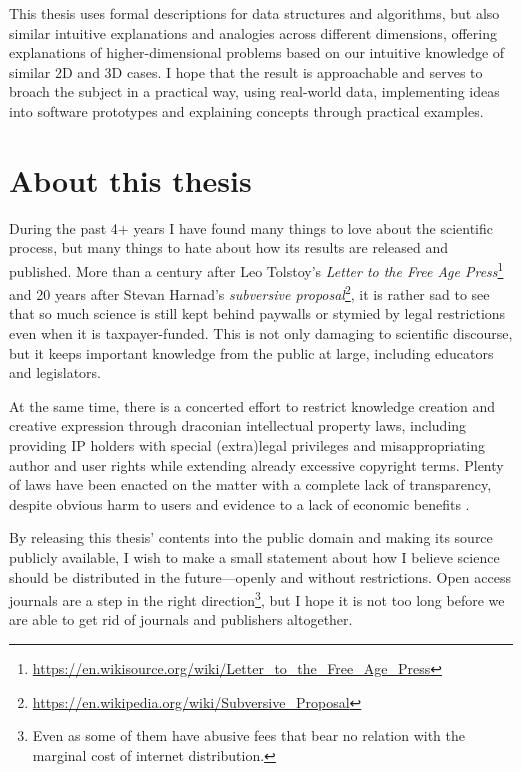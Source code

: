 This thesis uses formal descriptions for data structures and algorithms, but also similar intuitive explanations and analogies across different dimensions, offering explanations of higher-dimensional problems based on our intuitive knowledge of similar 2D and 3D cases.
I hope that the result is approachable and serves to broach the subject in a practical way, using real-world data, implementing ideas into software prototypes and explaining concepts through practical examples.

\section*{About this thesis}

During the past 4+ years I have found many things to love about the scientific process, but many things to hate about how its results are released and published.
More than a century after Leo Tolstoy's \emph{Letter to the Free Age Press}\footnote{\url{https://en.wikisource.org/wiki/Letter_to_the_Free_Age_Press}} and 20 years after Stevan Harnad's \emph{subversive proposal}\footnote{\url{https://en.wikipedia.org/wiki/Subversive_Proposal}}, it is rather sad to see that so much science is still kept behind paywalls or stymied by legal restrictions even when it is taxpayer-funded.
This is not only damaging to scientific discourse, but it keeps important knowledge from the public at large, including educators and legislators.

At the same time, there is a concerted effort to restrict knowledge creation and creative expression through draconian intellectual property laws, including providing IP holders with special (extra)legal privileges and misappropriating author and user rights while extending already excessive copyright terms.
Plenty of laws have been enacted on the matter with a complete lack of transparency, despite obvious harm to users and evidence to a lack of economic benefits \citep{Hargreaves11,Reda14,EFI15}.

By releasing this thesis' contents into the public domain and making its source publicly available, I wish to make a small statement about how I believe science should be distributed in the future---openly and without restrictions.
Open access journals are a step in the right direction\footnote{Even as some of them have abusive fees that bear no relation with the marginal cost of internet distribution.}, but I hope it is not too long before we are able to get rid of journals and publishers altogether.

